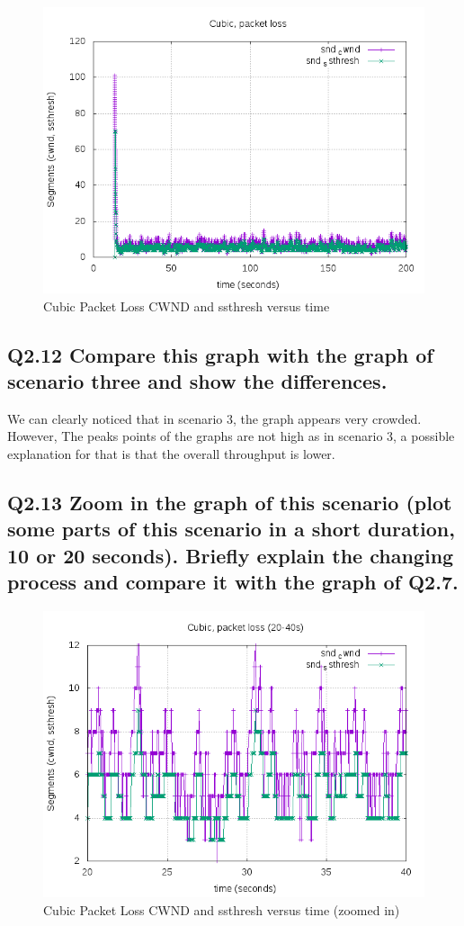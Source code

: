 \documentclass{article}
\begin{document}
\begin{figure}[H]
\centering
\includegraphics[width=12cm]{figures/CubicPLcwnd.png}
\caption{Cubic Packet Loss CWND and ssthresh versus time}
\end{figure}

\subsection{Q2.12 Compare this graph with the graph of scenario three
and show the differences.}

We can clearly noticed that in scenario 3, the graph appears very crowded. However, The peaks points of the graphs are not high as in scenario 3, a possible explanation for that is that the overall throughput is lower.


\subsection{Q2.13 Zoom in the graph of this scenario (plot some parts of
this scenario in a short duration, 10 or 20 seconds). Briefly explain
the changing process and compare it with the graph of Q2.7.}

\begin{figure}[H]
\centering
\includegraphics[width=12cm]{figures/CubicPLcwndZoom.png}
\caption{Cubic Packet Loss CWND and ssthresh versus time (zoomed in)}
\end{figure}
\end{document}
